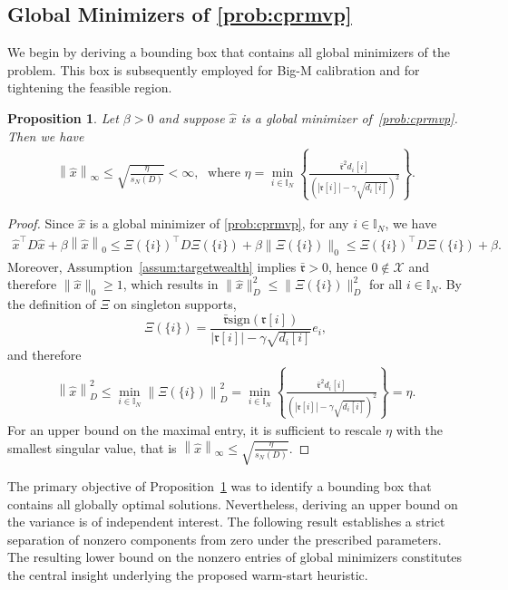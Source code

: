 \documentclass[11pt]{article}
\theoremstyle{plain}
\newtheorem{proposition}{Proposition}
\theoremstyle{definition}
\theoremstyle{plain}
\newcommand{\II}{{\mathbb I}}
\newcommand{\norm}[1]{\left\lVert#1\right\rVert}
\newcommand{\abs}[1]{\left\lvert#1\right\rvert}
\newcommand{\tpose}[1]{#1^{\top}}
\newcommand{\ccr}{{\mathfrak r}}
\newcommand{\cX}{{\mathcal X}}
\begin{document}
\subsection{Global Minimizers of \texorpdfstring{\eqref{prob:cprmvp}}{P1}}
We begin by deriving a bounding box that contains all global minimizers of the problem. This box is subsequently employed for Big-M calibration and for tightening the feasible region.
\begin{proposition}\label{prop:globup}
   Let $\beta>0$ and suppose $\hat{x}$ is a global minimizer of~\eqref{prob:cprmvp}. Then we have
    \begin{align*}
        \norm{\hat{x}}_\infty\leq \sqrt{\frac{\eta}{s_N(D)}}<\infty,  \;  \text{ where } \eta=\min_{i\in\II_N}\left\{\frac{\bar{\ccr}^2d_i[i]}{\left(|\ccr[i]|-\gamma\sqrt{d_i[i]}\right)^2}\right\}.\end{align*}
\end{proposition}
\begin{proof}
Since $\hat{x}$ is a global minimizer of \eqref{prob:cprmvp}, for any $i\in\II_N$, we have
\begin{align*}
\tpose{\hat{x}}D\hat{x}+\beta\norm{\hat{x}}_0\leq \tpose{\Xi(\{i\})}D\Xi(\{i\})+\beta\|\Xi(\{i\})\|_0\leq\tpose{\Xi(\{i\})}D\Xi(\{i\})+\beta.
\end{align*}
Moreover, Assumption~\ref{assum:targetwealth} implies $\bar\ccr>0$, hence $0\notin\cX$ and therefore $\|\hat x\|_0\geq 1$, which results in $\|\hat x\|_D^2\leq \|\Xi(\{i\})\|_D^2$ for all $i\in\II_N$. By the definition of $\Xi$ on singleton supports,
\[
 \Xi(\{i\})=\frac{\bar{\ccr} \mathrm{sign}(\ccr[i])}{|\ccr[i]|-\gamma\sqrt{d_i[i]}} e_i,
\]
and therefore
\begin{align*}
\norm{\hat{x}}_D^2\leq \min_{i\in\II_N}\norm{\Xi(\{i\})}_D^2=\min_{i\in\II_N}\left\{\frac{\bar{\ccr}^2d_i[i]}{(\abs{\ccr[i]}-\gamma\sqrt{d_i[i]})^2}\right\}=\eta.
\end{align*}
For an upper bound on  the maximal entry, it is sufficient to rescale $\eta$ with the smallest singular value, that is $    \norm{\hat{x}}_\infty\leq \sqrt{\frac{\eta}{s_N(D)}}
$.
\end{proof}
The primary objective of Proposition~\ref{prop:globup} was to identify a bounding box that contains all globally optimal solutions. Nevertheless, deriving an upper bound on the variance is of independent interest. The following result establishes a strict separation of nonzero components from zero under the prescribed parameters. The resulting lower bound on the nonzero entries of global minimizers constitutes the central insight underlying the proposed warm-start heuristic.
\end{document}

